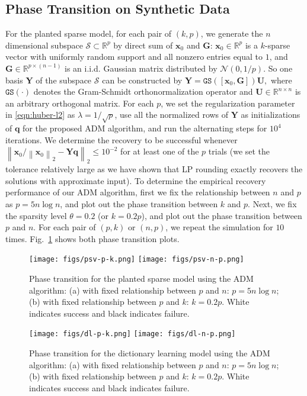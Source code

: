 \documentclass[11pt, journal, final]{IEEEtran}
\numberwithin{equation}{section}
\newcommand{\R}{\mathbb{R}}
\newcommand{\mb}{\mathbf}
\newcommand{\mc}{\mathcal}
\newcommand{\norm}[1]{\left\lVert#1\right\rVert}
\newcommand{ \brac }[1]{\left[ #1 \right]}
\newcommand{ \paren }[1]{ \left( #1 \right) }
\begin{document}
{\subsection{Phase Transition on Synthetic Data}
For the planted sparse model, for each pair of $(k,p)$, we generate the $n$ dimensional subspace $\mathcal{S}\subset \mathbb{R}^p$ by direct sum of $\mb x_0$ and $\mb G$: $\mb x_0 \in \R^p$ is a $k$-sparse vector with uniformly random support and all nonzero entries equal to $1$, and $\mb G \in \R^{p \times (n-1)}$ is an i.i.d. Gaussian matrix distributed by $\mc N(0, 1/p)$. So one basis $\mb Y$ of the subspace $\mc S$ can be constructed by
$
{\mb Y} = \mathtt{GS}\paren{\brac{{\mb x}_0,{\mb G}}}{\mb U},
$
where $\mathtt{GS}\paren{\cdot}$ denotes the Gram-Schmidt orthonormalization operator and ${\mb U}\in \R^{n\times n}$ is an arbitrary orthogonal matrix. For each $p$, we set the regularization parameter in \eqref{eqn:huber-l2} as $\lambda = 1/\sqrt{p}$, use all the normalized rows of ${\mb Y}$ as initializations of ${\mb q}$ for the proposed ADM algorithm, and run the alternating steps for $10^4$ iterations. We determine the recovery to be successful whenever $\norm{\mb x_0/\norm{\mb x_0}_2- \mb Y \mb q}_2 \le 10^{-2}$ for at least one of the $p$ trials (we set the tolerance relatively large as we have shown that LP rounding exactly recovers the solutions with approximate input). To determine the empirical recovery performance of our ADM algorithm, first we fix the relationship between $n$ and $p$ as $p=5n \log n$, and plot out the phase transition between $k$ and $p$. Next, we fix the sparsity level $\theta = 0.2$ (or $k = 0.2p$), and plot out the phase transition between $p$ and $n$. For each pair of $(p,k)$ or $(n,p)$, we repeat the simulation for $10$ times. Fig.~\ref{phase_transition:psv} shows both phase transition plots.
\begin{figure}[!htbp]
\centering
\texttt{[image: figs/psv-p-k.png]}
\texttt{[image: figs/psv-n-p.png]}
\caption{Phase transition for the planted sparse model using the ADM algorithm: (a) with fixed relationship between $p$ and $n$: $p = 5n\log n$; (b) with fixed relationship between $p$ and $k$: $k = 0.2 p$. White indicates success and black indicates failure.}
\label{phase_transition:psv}
\end{figure}

\begin{figure}[!htbp]
\centering
\texttt{[image: figs/dl-p-k.png]}
\texttt{[image: figs/dl-n-p.png]}
\caption{Phase transition for the dictionary learning model using the ADM algorithm: (a) with fixed relationship between $p$ and $n$: $p = 5n\log n$; (b) with fixed relationship between $p$ and $k$: $k = 0.2 p$. White indicates success and black indicates failure.}
\label{phase_transition:dl}
\end{figure}

}
\end{document}
